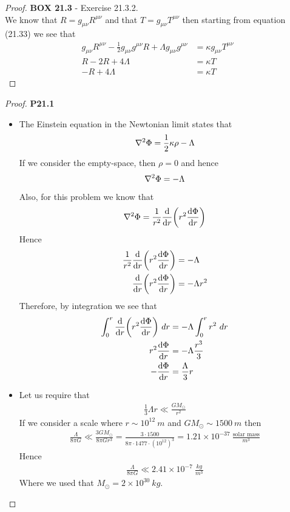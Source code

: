\documentclass[11pt]{article}
\newcommand{\sci}[1]{\times 10^{#1}}
\theoremstyle{definition}
\begin{document}
\begin{proof}{\textbf{BOX 21.3} - Exercise 21.3.2.}\\
We know that $R = g_{\mu\nu}R^{\mu\nu}$ and that $T = g_{\mu\nu}T^{\mu\nu}$
then starting from equation (21.33) we see that
\begin{align*}
    g_{\mu\nu}R^{\mu\nu} - \frac{1}{2}g_{\mu\nu}g^{\mu\nu}R
    + \Lambda g_{\mu\nu}g^{\mu\nu} &= \kappa g_{\mu\nu} T^{\mu\nu} \\
    R - 2R + 4\Lambda  &= \kappa T \\
    - R + 4\Lambda  &= \kappa T
\end{align*}
\end{proof}

\cleardoublepage
\begin{proof}{\textbf{P21.1}}\\
\begin{itemize}
\item [\textbf{(a)}] The Einstein equation in the Newtonian limit states that
\begin{align*}
    \laplacian{\Phi} = \frac{1}{2}\kappa\rho - \Lambda
\end{align*}
If we consider the empty-space, then $\rho = 0$ and hence
\begin{align*}
    \laplacian{\Phi} = - \Lambda
\end{align*}
Also, for this problem we know that 
\begin{align*}
    \laplacian{\Phi} = \frac{1}{r^2}\dv{r}(r^2\dv{\Phi}{r})
\end{align*}
Hence
\begin{align*}
    \frac{1}{r^2}\dv{r}(r^2\dv{\Phi}{r}) &= - \Lambda \\
    \dv{r}(r^2\dv{\Phi}{r}) &= - \Lambda r^2
\end{align*}
Therefore, by integration we see that
\begin{align*}
    \int_0^r \dv{r}(r^2\dv{\Phi}{r})~dr &= - \Lambda \int_0^r r^2~dr \\
    r^2\dv{\Phi}{r} &= - \Lambda \frac{r^3}{3} \\
    -\dv{\Phi}{r} &= \frac{\Lambda}{3}r
\end{align*}
\item [\textbf{(b)}] Let us require that
\begin{align*}
    \frac{1}{3}\Lambda r \ll \frac{GM_{\odot}}{r^2}
\end{align*}
If we consider a scale where $r \sim 10^{12}~m$ and $GM_\odot \sim 1500~m$
then
\begin{align*}
    \frac{\Lambda}{8\pi G} \ll \frac{3GM_{\odot}}{8\pi Gr^3}
    = \frac{3 \cdot 1500}{8\pi\cdot 1477\cdot (10^{12})^3}
    = 1.21\sci{-37}~\frac{\text{solar mass}}{m^3}
\end{align*}
Hence
\begin{align*}
    \frac{\Lambda}{8\pi G} \ll 2.41\sci{-7}~\frac{kg}{m^3}
\end{align*}
Where we used that $M_\odot = 2\sci{30}~kg$.
\end{itemize}
\end{proof}
\end{document}
